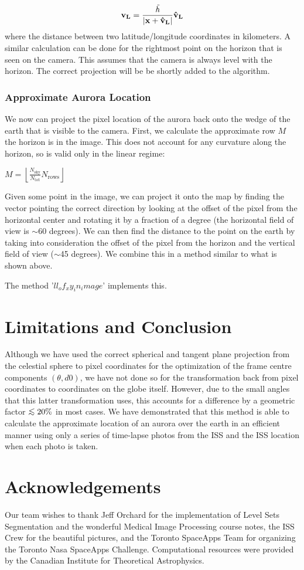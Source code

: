 \documentclass[onecolumn,preprintnumbers,amsmath,amssymb]{revtex4}
\newcommand{\lsim}{\mathrel{\hbox{\rlap{\lower.55ex\hbox{$\sim$}} \kern-.3em \raise.4ex \hbox{$<$}}}}
\newcommand{\beq}{\begin{equation}}
\newcommand{\eeq}{\end{equation}}
\newcommand{\floor}[1]{\left\lfloor #1 \right\rfloor}
\begin{document}
\beq
\bf{v}_L = 
\frac{\it \tilde{h}}{|\bf{x}+\hat{\bf{v}}_L|} \hat{\bf{v}}_L
\eeq
where the distance between two latitude/longitude coordinates in kilometers.  A similar calculation can be done for the rightmost point on the horizon that is seen on the camera.  This assumes that the camera is always level with the horizon.  The correct projection will be be shortly added to the algorithm.

\subsubsection { \bf Approximate Aurora Location }

We now can project the pixel location of the aurora back onto the wedge of the earth that is visible to the camera.  First, we calculate the approximate row $M$ the horizon is in the image.  This does not account for any curvature along the horizon, so is valid only in the linear regime:
\begin{center}
$M = \floor{\frac{N_\text{sky}}{N_\text{tot}} N_\text{rows}}$
\end{center}
Given some point in the image, we can project it onto the map by finding the vector pointing the correct direction by looking at the offset of the pixel from the horizontal center and rotating it by a fraction of a degree (the horizontal field of view is $\sim$60 degrees).  We can then find the distance to the point on the earth by taking into consideration the offset of the pixel from the horizon and the vertical field of view ($\sim$45 degrees).  We combine this in a method similar to what is shown above. 

The method '$ll_of_xy_in_image$' implements this.

\section{ \bf Limitations and Conclusion }

Although we have used the correct spherical and tangent plane projection from the celestial sphere to pixel coordinates for the optimization of the frame centre components $(\theta, d0)$, we have not done so for the transformation back from pixel coordinates to coordinates on the globe itself.  However, due to the small angles that this latter transformation uses, this accounts for a difference by a geometric factor $\lsim 20\%$ in most cases.  We have demonstrated that this method is able to calculate the approximate location of an aurora over the earth in an efficient manner using only a series of time-lapse photos from the ISS and the ISS location when each photo is taken.

\section{ \bf Acknowledgements }

Our team wishes to thank Jeff Orchard for the implementation of Level Sets Segmentation and the wonderful Medical Image Processing course notes, the ISS Crew for the beautiful pictures, and the Toronto SpaceApps Team for organizing the Toronto Nasa SpaceApps Challenge.  Computational resources were provided by the Canadian Institute for Theoretical Astrophysics.
\end{document}
